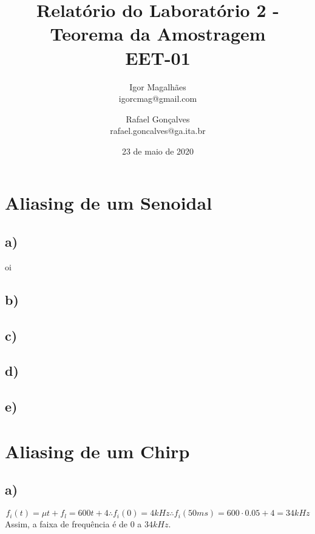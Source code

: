 \documentclass[a4paper, 12pt]{article}
\title{Relatório do Laboratório 2 - Teorema da Amostragem \\ EET-01}
\author{
  Igor Magalhães\\igorcmag@gmail.com
  \and
  Rafael Gonçalves\\rafael.goncalves@ga.ita.br
}
\date{23 de maio de 2020}
\begin{document}
\maketitle
\section{Aliasing de um Senoidal}

\subsection{a)}
oi
%


\subsection{b)}

\subsection{c)}

\subsection{d)}

\subsection{e)}

\section{Aliasing de um Chirp}

\subsection{a)}

$$f_i(t)=\mu t+f_l=600t+4 \therefore f_i(0)=4kHz \therefore f_i(50ms)=600\cdot 0.05+4=34kHz$$
Assim, a faixa de frequência é de $0$ a $34kHz$.
\end{document}
